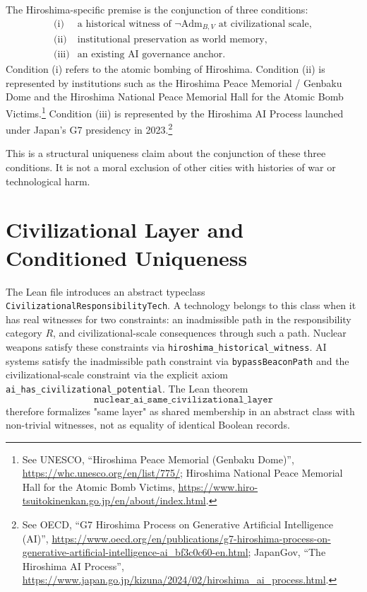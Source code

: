 \documentclass[11pt]{article}
\begin{document}
The Hiroshima-specific premise is the conjunction of three conditions:
\[
\begin{array}{ll}
\text{(i)} & \text{a historical witness of } \neg\mathrm{Adm}_{B,V}
             \text{ at civilizational scale},\\
\text{(ii)}& \text{institutional preservation as world memory},\\
\text{(iii)}& \text{an existing AI governance anchor.}
\end{array}
\]
Condition (i) refers to the atomic bombing of Hiroshima.  Condition (ii) is
represented by institutions such as the Hiroshima Peace Memorial / Genbaku Dome
and the Hiroshima National Peace Memorial Hall for the Atomic Bomb
Victims.\footnote{See UNESCO, ``Hiroshima Peace Memorial (Genbaku Dome)'',
\url{https://whc.unesco.org/en/list/775/}; Hiroshima National Peace Memorial
Hall for the Atomic Bomb Victims,
\url{https://www.hiro-tsuitokinenkan.go.jp/en/about/index.html}.}
Condition (iii) is represented by the Hiroshima AI Process launched under
Japan's G7 presidency in 2023.\footnote{See OECD, ``G7 Hiroshima Process on
Generative Artificial Intelligence (AI)'',
\url{https://www.oecd.org/en/publications/g7-hiroshima-process-on-generative-artificial-intelligence-ai_bf3c0c60-en.html};
JapanGov, ``The Hiroshima AI Process'',
\url{https://www.japan.go.jp/kizuna/2024/02/hiroshima_ai_process.html}.}

This is a structural uniqueness claim about the conjunction of these three
conditions.  It is not a moral exclusion of other cities with histories of war
or technological harm.

\section*{Civilizational Layer and Conditioned Uniqueness}

The Lean file introduces an abstract typeclass
\texttt{CivilizationalResponsibilityTech}.  A technology belongs to this class
when it has real witnesses for two constraints: an inadmissible path in the
responsibility category $R$, and civilizational-scale consequences through such
a path.  Nuclear weapons satisfy these constraints via
\texttt{hiroshima\_historical\_witness}.  AI systems satisfy the inadmissible
path constraint via \texttt{bypassBeaconPath} and the civilizational-scale
constraint via the explicit axiom
\texttt{ai\_has\_civilizational\_potential}.  The Lean theorem
\[
\texttt{nuclear\_ai\_same\_civilizational\_layer}
\]
therefore formalizes "same layer" as shared membership in an abstract class
with non-trivial witnesses, not as equality of identical Boolean records.
\end{document}
